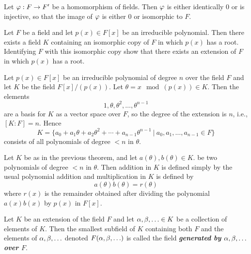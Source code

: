\nl

\begin{prop}
Let $\varphi: F\rightarrow F^\prime$ be a homomorphism of fields. Then $\varphi$ is either identically 0 or is injective, so that the image of $\varphi$ is either 0 or isomorphic to $F$.
\end{prop}

\nl

\begin{thm}
Let $F$ be a field and let $p(x)\in F[x]$ be an irreducible polynomial. Then there exists a field $K$ containing an isomorphic copy of $F$ in which $p(x)$ has a root. Identifying $F$ with this isomorphic copy show that there exists an extension of $F$ in which $p(x)$ has a root.
\end{thm}

\nl

\begin{thm}
Let $p(x)\in F[x]$ be an irreducible polynomial of degree $n$ over the field $F$ and let $K$ be the field $F[x]/(p(x))$. Let $\theta = x\mod(p(x))\in K$. Then the elements 
\[1, \theta, \theta^2,\ldots, \theta^{n-1}\]
are a basis for $K$ as a vector space over $F$, so the degree of the extension is $n$, i.e., $[K:F] = n$. Hence
\[K = \{a_0 + a_1\theta + a_2\theta^2 + \cdots + a_{n - 1}\theta^{n - 1}\ |\ a_0, a_1, \ldots, a_{n - 1}\in F\}\]
consists of all polynomials of degree $<n$ in $\theta$.
\end{thm}

\nl

\begin{cor}
Let $K$ be as in the previous theorem, and let $a(\theta), b(\theta)\in K$. be two polynomials of degree $<n$ in $\theta$. Then addition in $K$ is defined simply by the usual polynomial addition and multiplication in $K$ is defined by
\[a(\theta)b(\theta) = r(\theta)\]
where $r(x)$ is the remainder obtained after dividing the polynomial $a(x)b(x)$ by $p(x)$ in $F[x]$.
\end{cor}

\nl

\begin{defn}
Let $K$ be an extension of the field $F$ and let $\alpha,\beta,\ldots\in K$ be a collection of elements of $K$. Then the smallest subfield of $K$ containing both $F$ and the elements of $\alpha,\beta,\ldots$ denoted $F(\alpha,\beta,\ldots)$ is called the field \textbf{\textit{generated by $\alpha,\beta,\ldots$ over $F$}}.
\end{defn}

\nl


